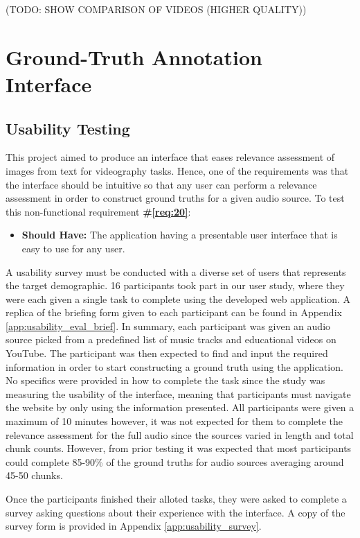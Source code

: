 \documentclass{l4proj}
\begin{document}
(TODO: SHOW COMPARISON OF VIDEOS (HIGHER QUALITY))


\section{Ground-Truth Annotation Interface}
\subsection{Usability Testing}
This project aimed to produce an interface that eases relevance assessment of images from text for videography tasks. Hence, one of the requirements was that the interface should be intuitive so that any user can perform a relevance assessment in order to construct ground truths for a given audio source. To test this non-functional requirement \textbf{\#\ref{req:20}}:

\begin{itemize}
    \item \textbf{Should Have:} The application having a presentable user interface that is easy to use for any user.
\end{itemize}

A usability survey must be conducted with a diverse set of users that represents the target demographic. 16 participants took part in our user study, where they were each given a single task to complete using the developed web application. A replica of the briefing form given to each participant can be found in Appendix \ref{app:usability_eval_brief}. In summary, each participant was given an audio source picked from a predefined list of music tracks and educational videos on YouTube. The participant was then expected to find and input the required information in order to start constructing a ground truth using the application. No specifics were provided in how to complete the task since the study was measuring the usability of the interface, meaning that participants must navigate the website by only using the information presented. All participants were given a maximum of 10 minutes however, it was not expected for them to complete the relevance assessment for the full audio since the sources varied in length and total chunk counts. However, from prior testing it was expected that most participants could complete 85-90\% of the ground truths for audio sources averaging around 45-50 chunks.

Once the participants finished their alloted tasks, they were asked to complete a survey asking questions about their experience with the interface. A copy of the survey form is provided in Appendix \ref{app:usability_survey}.
\end{document}
